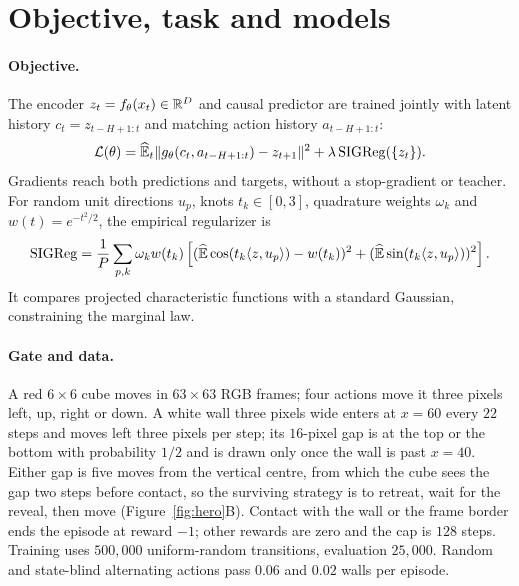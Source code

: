 \section{Objective, task and models}
\label{sec:worlds}

\paragraph{Objective.} The encoder $z_t=f_\theta(x_t)\in\mathbb{R}^D$ and causal predictor are trained jointly
with latent history $c_t=z_{t-H+1:t}$ and matching action history $a_{t-H+1:t}$:
\begin{equation}
\label{eq:lewm}
\mathcal{L}(\theta)=\widehat{\mathbb{E}}_t\|g_\theta(c_t,a_{t-H+1:t})-z_{t+1}\|^2
+\lambda\,\mathrm{SIGReg}(\{z_t\}).
\end{equation}
Gradients reach both predictions and targets, without a stop-gradient or teacher.
For random unit directions $u_p$, knots $t_k\in[0,3]$, quadrature weights $\omega_k$ and
$w(t)=e^{-t^2/2}$, the empirical regularizer is
\begin{equation}
\label{eq:sigreg}
\mathrm{SIGReg}=\frac1P\sum_{p,k}\omega_k w(t_k)
\left[(\widehat{\mathbb{E}}\cos(t_k\langle z,u_p\rangle)-w(t_k))^2
+(\widehat{\mathbb{E}}\sin(t_k\langle z,u_p\rangle))^2\right].
\end{equation}
It compares projected characteristic functions with a standard Gaussian, constraining the marginal law.

\paragraph{Gate and data.} A red $6\times6$ cube moves in $63\times63$ RGB frames; four actions move it
three pixels left, up, right or down. A white wall three pixels wide enters at $x=60$ every $22$ steps and
moves left three pixels per step; its $16$-pixel gap is at the top or the bottom with probability $1/2$ and is
drawn only once the wall is past $x=40$. Either gap is five moves from the vertical centre, from which the cube
sees the gap two steps before contact, so the surviving strategy is to retreat, wait for the reveal, then move
(Figure~\ref{fig:hero}B). Contact with the wall or the frame border ends the episode at reward $-1$; other
rewards are zero and the cap is $128$ steps. Training uses $500{,}000$ uniform-random transitions, evaluation
$25{,}000$. Random and state-blind alternating actions pass $0.06$ and $0.02$ walls per episode.

